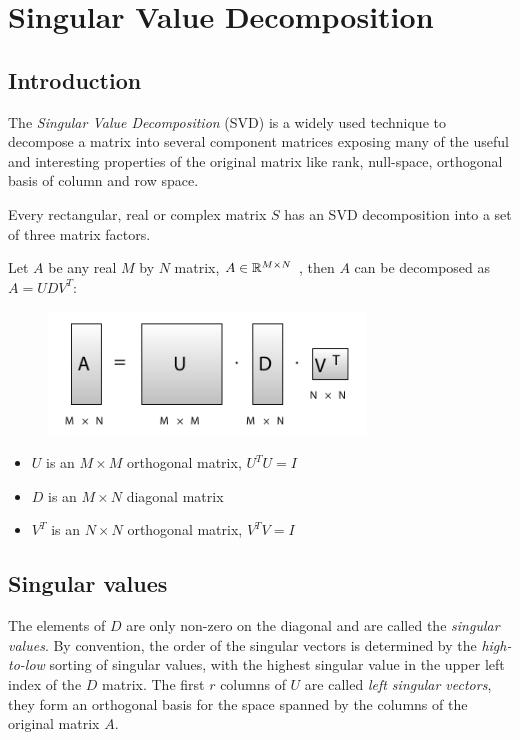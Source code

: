 \section{Singular Value Decomposition}

\subsection{Introduction}
The \emph{Singular Value Decomposition} (SVD) is a widely used technique to decompose a matrix into several component matrices exposing many of the useful and interesting properties of the original matrix
like rank, null-space, orthogonal basis of column and row space. 

Every rectangular, real or complex matrix $S$ has an SVD decomposition into a set of three matrix factors.

Let $A$ be any real $M$ by $N$ matrix, $A \in \mathbb{R}^{M\times N}$ , then $A$ can be decomposed as $A=UDV^T$:
\begin{figure}[H]
    \centering
    \includegraphics[width=0.75\textwidth]{img/svd_decomposition}
\end{figure}
\begin{itemize}
    \item $U$ is an $M\times M$ orthogonal matrix, $U^TU=I$
    \item $D$ is an $M\times N$ diagonal matrix
    \item $V^T$  is an $N\times N$ orthogonal matrix, $V^TV=I$ 
\end{itemize}
\subsection{Singular values}
The elements of $D$ are only non-zero on the diagonal and are called the \emph{singular values}. By convention, the order of the singular vectors is determined by the \emph{high-to-low} sorting of singular values, with the highest singular value in the upper left index of the $D$ matrix.
The first $r$ columns of $U$ are called \emph{left singular vectors}, they form an orthogonal basis for the space spanned by the columns of the original matrix $A$.


